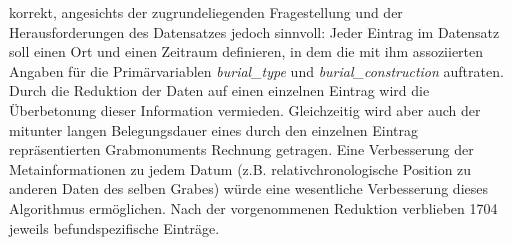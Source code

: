 \documentclass[openany,twoside,twocolumn]{book}
\begin{document}
korrekt, angesichts der zugrundeliegenden Fragestellung und der
Herausforderungen des Datensatzes jedoch sinnvoll: Jeder Eintrag im
Datensatz soll einen Ort und einen Zeitraum definieren, in dem die mit
ihm assoziierten Angaben für die Primärvariablen \emph{burial\_type} und
\emph{burial\_construction} auftraten. Durch die Reduktion der Daten auf
einen einzelnen Eintrag wird die Überbetonung dieser Information
vermieden. Gleichzeitig wird aber auch der mitunter langen
Belegungsdauer eines durch den einzelnen Eintrag repräsentierten
Grabmonuments Rechnung getragen. Eine Verbesserung der Metainformationen
zu jedem Datum (z.B. relativchronologische Position zu anderen Daten des
selben Grabes) würde eine wesentliche Verbesserung dieses Algorithmus
ermöglichen. Nach der vorgenommenen Reduktion verblieben 1704 jeweils
befundspezifische Einträge.
\end{document}
